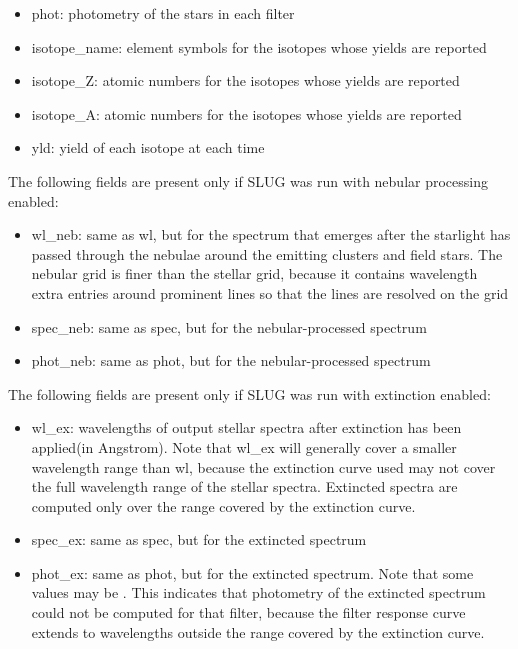 \documentclass[letterpaper,10pt,english]{sphinxmanual}
\begin{document}
\begin{itemize}
\item {} 
phot: photometry of the stars in each filter

\item {} 
isotope\_name: element symbols for the isotopes whose yields are reported

\item {} 
isotope\_Z: atomic numbers for the isotopes whose yields are reported

\item {} 
isotope\_A: atomic numbers for the isotopes whose yields are reported

\item {} 
yld: yield of each isotope at each time

\end{itemize}

The following fields are present only if SLUG was run with nebular processing enabled:
\begin{itemize}
\item {} 
wl\_neb: same as wl, but for the spectrum that emerges after the starlight has passed through the nebulae around the emitting clusters and field stars. The nebular grid is finer than the stellar grid, because it contains wavelength extra entries around prominent lines so that the lines are resolved on the grid

\item {} 
spec\_neb: same as spec, but for the nebular-processed spectrum

\item {} 
phot\_neb: same as phot, but for the nebular-processed spectrum

\end{itemize}

The following fields are present only if SLUG was run with extinction enabled:
\begin{itemize}
\item {} 
wl\_ex: wavelengths of output stellar spectra after extinction has been applied(in Angstrom). Note that wl\_ex will generally cover a smaller wavelength range than wl, because the extinction curve used may not cover the full wavelength range of the stellar spectra. Extincted spectra are computed only over the range covered by the extinction curve.

\item {} 
spec\_ex: same as spec, but for the extincted spectrum

\item {} 
phot\_ex: same as phot, but for the extincted spectrum. Note that some values may be . This indicates that photometry of the extincted spectrum could not be computed for that filter, because the filter response curve extends to wavelengths outside the range covered by the extinction curve.

\end{itemize}
\end{document}
